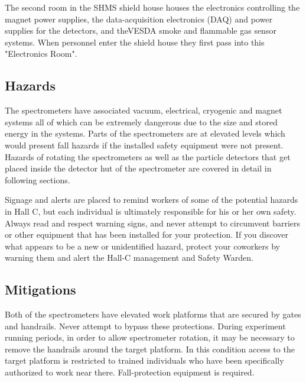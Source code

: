 {The second room in the SHMS shield house houses the
electronics controlling the magnet power supplies, the data-acquisition 
electronics (DAQ) and power supplies for the detectors, and theVESDA
smoke and flammable gas sensor systems. When personnel enter the shield
house they first pass into this "Electronics Room". 
}

\begin{safetyen}{0}{0}
\label{sec:hrs-safety}

\subsection{Hazards}

The spectrometers have associated vacuum, electrical, cryogenic and
magnet systems all of which can be extremely dangerous due to the size
and stored energy in the systems.  
Parts of the spectrometers are at elevated levels which would present fall
hazards if the installed safety equipment were not present.
Hazards of rotating the
spectrometers as well as the particle detectors that get placed inside
the detector hut of the spectrometer are covered in detail in
following sections.

Signage and alerts are placed to remind workers of some of the potential hazards
in Hall C, but each individual is ultimately responsible for his or her own 
safety. Always read and respect warning signs, and never attempt to 
circumvent barriers or other equipment
that has been installed for your protection. If you discover what appears to be a
new or unidentified hazard, protect your coworkers by warning them
and alert the Hall-C management and Safety Warden.

\subsection{Mitigations}

Both of the spectrometers have elevated work platforms that are secured by
gates and handrails. Never attempt to bypass these protections. During experiment
running periods, in order to allow spectrometer rotation, it may be necessary to
remove the handrails around the target platform. In this condition access to the 
target platform is restricted to trained individuals who have been specifically
authorized to work near there. Fall-protection equipment is required.


\end{safetyen}
